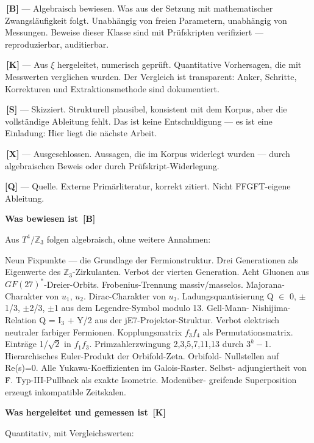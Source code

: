 \documentclass[11pt,oneside]{book}
\newcommand{\status}[1]{\penalty10000\,{\scriptsize\textcolor{gray!60}{[#1]}}}
\begin{document}
\textbf{\status{B}} — Algebraisch bewiesen. Was aus der Setzung mit mathematischer
Zwangsläufigkeit folgt. Unabhängig von freien Parametern, unabhängig von
Messungen. Beweise dieser Klasse sind mit Prüfskripten verifiziert —
reproduzierbar, auditierbar.


\textbf{\status{K}} — Aus $\xi$ hergeleitet, numerisch geprüft. Quantitative Vorhersagen,
die mit Messwerten verglichen wurden. Der Vergleich ist transparent:
Anker, Schritte, Korrekturen und Extraktionsmethode sind dokumentiert.


\textbf{\status{S}} — Skizziert. Strukturell plausibel, konsistent mit dem Korpus,
aber die vollständige Ableitung fehlt. Das ist keine Entschuldigung —
es ist eine Einladung: Hier liegt die nächste Arbeit.


\textbf{\status{X}} — Ausgeschlossen. Aussagen, die im Korpus widerlegt wurden —
durch algebraischen Beweis oder durch Prüfskript-Widerlegung.


\textbf{[Q]} — Quelle. Externe Primärliteratur, korrekt zitiert. Nicht
FFGFT-eigene Ableitung.


\textbf{Was bewiesen ist \status{B}}


Aus $T^4/\mathbb{Z}_3$ folgen algebraisch, ohne weitere Annahmen:


Neun Fixpunkte — die Grundlage der Fermionstruktur. Drei Generationen
als Eigenwerte des $\mathbb{Z}_3$-Zirkulanten. Verbot der vierten Generation. Acht
Gluonen aus $GF(27)^*$-Dreier-Orbits. Frobenius-Trennung massiv/masselos.
Majorana-Charakter von $
u_1$, $
u_2$. Dirac-Charakter von $
u_3$. Ladungsquantisierung
Q $\in$ {0, $\pm$1/3, $\pm$2/3, $\pm$1} aus dem Legendre-Symbol modulo 13. Gell-Mann-
Nishijima-Relation Q = I$_3$ + Y/2 aus der jE7-Projektor-Struktur. Verbot
elektrisch neutraler farbiger Fermionen. Kopplungsmatrix $f_3$\times$f_4$ als
Permutationsmatrix. Einträge 1/$\sqrt{2}$ in $f_1$\times$f_3$. Primzahlerzwingung {2,3,5,7,11,13}
durch $3^k-$1. Hierarchisches Euler-Produkt der Orbifold-Zeta. Orbifold-
Nullstellen auf Re(s)=0. Alle Yukawa-Koeffizienten im Galois-Raster. Selbst-
adjungiertheit von F̂. Typ-III-Pullback als exakte Isometrie. Modenüber-
greifende Superposition erzeugt inkompatible Zeitskalen.


\textbf{Was hergeleitet und gemessen ist \status{K}}


Quantitativ, mit Vergleichswerten:
\end{document}
